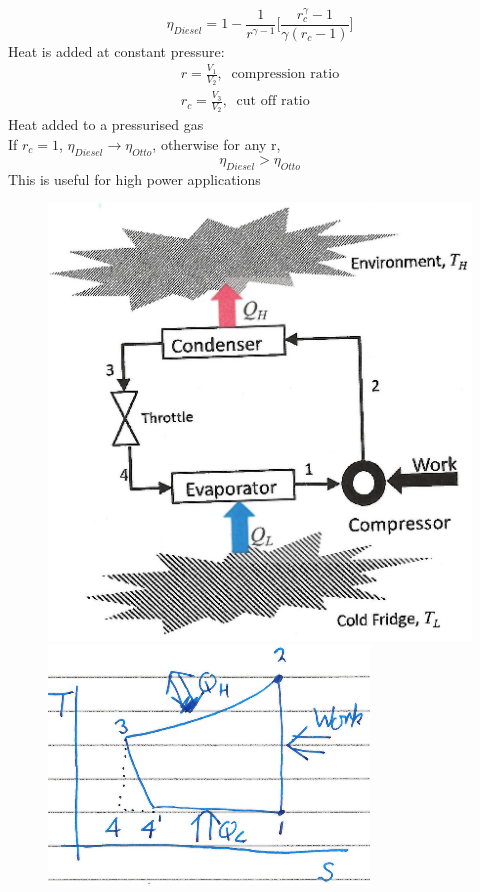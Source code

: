 \documentclass[a4paper, 11pt, normalem]{report}
\begin{document}
\begin{equation*}
    \eta_{Diesel} = 1 - \frac{1}{r^{\gamma - 1}} \Bigg[\frac{r_{c}^\gamma - 1}{\gamma (r_c - 1)}\Bigg]
\end{equation*}
Heat is added at constant pressure:
\begin{gather*}
    r = \frac{V_1}{V_2}, ~\text{ compression ratio} \\
    r_c = \frac{V_3}{V_2}, ~\text{ cut off ratio}
\end{gather*}
Heat added to a pressurised gas \\
If $r_c = 1$, $\eta_{Diesel} \to \eta_{Otto}$, otherwise for any r,
\begin{equation*}
    \eta_{Diesel} > \eta_{Otto}
\end{equation*}
This is useful for high power applications
\begin{figure}[H]
    \centering
    \includegraphics[scale=0.5]{Throttle.png}
    \hspace{20pt}
    \includegraphics[scale=0.7]{Throttle2.png}
\end{figure}
\end{document}
